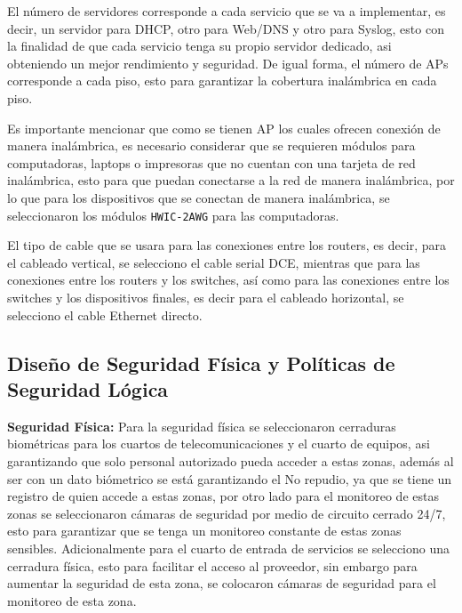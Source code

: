 \documentclass[letterpaper,11pt]{article}
\begin{document}
    El número de servidores corresponde a cada servicio que se va a implementar, es decir, un servidor para DHCP, otro para Web/DNS y otro para Syslog, esto con la finalidad de que cada servicio tenga su propio servidor dedicado, asi obteniendo un mejor rendimiento y seguridad. De igual forma, el número de APs corresponde a cada piso, esto para garantizar la cobertura inalámbrica en cada piso.

    Es importante mencionar que como se tienen AP los cuales ofrecen conexión de manera inalámbrica, es necesario considerar que se requieren módulos para computadoras, laptops o impresoras que no cuentan con una tarjeta de red inalámbrica, esto para que puedan conectarse a la red de manera inalámbrica, por lo que para los dispositivos que se conectan de manera inalámbrica, se seleccionaron los módulos \texttt{HWIC-2AWG} para las computadoras.

    El tipo de cable que se usara para las conexiones entre los routers, es decir, para el cableado vertical, se selecciono el cable serial DCE, mientras que para las conexiones entre los routers y los switches, así como para las conexiones entre los switches y los dispositivos finales, es decir para el cableado horizontal, se selecciono el cable Ethernet directo.

    \subsection{Diseño de Seguridad Física y  Políticas de Seguridad Lógica}

    \textbf{Seguridad Física:} Para la seguridad física se seleccionaron cerraduras biométricas para los cuartos de telecomunicaciones y el cuarto de equipos, asi garantizando que solo personal autorizado pueda acceder a estas zonas, además al ser con un dato biómetrico se está garantizando el No repudio, ya que se tiene un registro de quien accede a estas zonas, por otro lado para el monitoreo de estas zonas se seleccionaron cámaras de seguridad por medio de circuito cerrado 24/7, esto para garantizar que se tenga un monitoreo constante de estas zonas sensibles. Adicionalmente para el cuarto de entrada de servicios se selecciono una cerradura física, esto para facilitar el acceso al proveedor, sin embargo para aumentar la seguridad de esta zona, se colocaron cámaras de seguridad para el monitoreo de esta zona.
\end{document}
